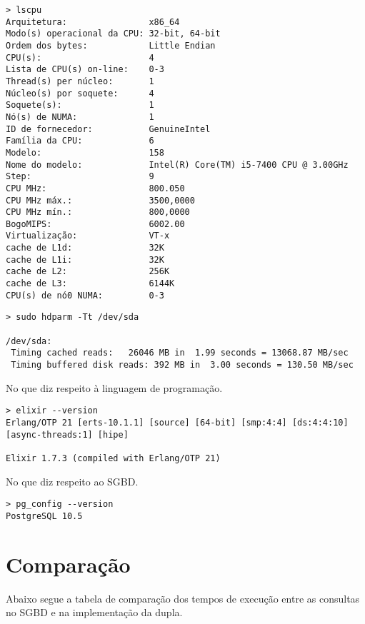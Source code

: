 \documentclass[12pt]{article}
\begin{document}
\begin{verbatim}
> lscpu
Arquitetura:                x86_64
Modo(s) operacional da CPU: 32-bit, 64-bit
Ordem dos bytes:            Little Endian
CPU(s):                     4
Lista de CPU(s) on-line:    0-3
Thread(s) per núcleo:       1
Núcleo(s) por soquete:      4
Soquete(s):                 1
Nó(s) de NUMA:              1
ID de fornecedor:           GenuineIntel
Família da CPU:             6
Modelo:                     158
Nome do modelo:             Intel(R) Core(TM) i5-7400 CPU @ 3.00GHz
Step:                       9
CPU MHz:                    800.050
CPU MHz máx.:               3500,0000
CPU MHz mín.:               800,0000
BogoMIPS:                   6002.00
Virtualização:              VT-x
cache de L1d:               32K
cache de L1i:               32K
cache de L2:                256K
cache de L3:                6144K
CPU(s) de nó0 NUMA:         0-3
\end{verbatim}

\begin{verbatim}
> sudo hdparm -Tt /dev/sda

/dev/sda:
 Timing cached reads:   26046 MB in  1.99 seconds = 13068.87 MB/sec
 Timing buffered disk reads: 392 MB in  3.00 seconds = 130.50 MB/sec
\end{verbatim}

No que diz respeito à linguagem de programação.

\begin{verbatim}
> elixir --version
Erlang/OTP 21 [erts-10.1.1] [source] [64-bit] [smp:4:4] [ds:4:4:10]
[async-threads:1] [hipe]

Elixir 1.7.3 (compiled with Erlang/OTP 21)
\end{verbatim}

No que diz respeito ao SGBD.

\begin{verbatim}
> pg_config --version
PostgreSQL 10.5
\end{verbatim}

\section{Comparação}

Abaixo segue a tabela de comparação dos tempos de execução entre as consultas no
SGBD e na implementação da dupla.
\end{document}
